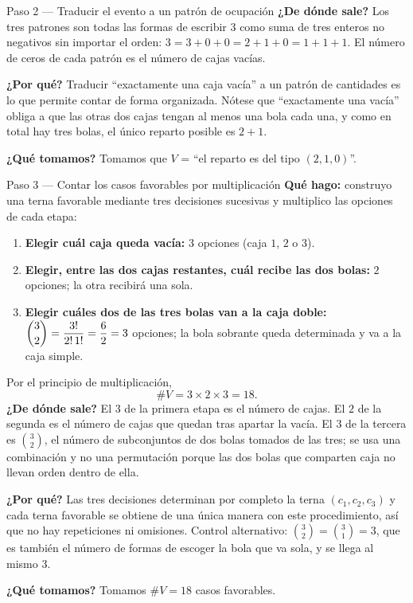 \documentclass[11pt]{article}
\begin{document}
\begin{sol}
\begin{paso}{Paso 2 --- Traducir el evento a un patrón de ocupación}
\textbf{¿De dónde sale?} Los tres patrones son todas las formas de escribir $3$ como suma de
tres enteros no negativos sin importar el orden: $3=3+0+0=2+1+0=1+1+1$. El número de ceros de
cada patrón es el número de cajas vacías.

\textbf{¿Por qué?} Traducir ``exactamente una caja vacía'' a un patrón de cantidades es lo que
permite contar de forma organizada. Nótese que ``exactamente una vacía'' obliga a que las
otras dos cajas tengan al menos una bola cada una, y como en total hay tres bolas, el único
reparto posible es $2+1$.

\textbf{¿Qué tomamos?} Tomamos que $V$ = ``el reparto es del tipo $(2,1,0)$''.
\end{paso}

\begin{paso}{Paso 3 --- Contar los casos favorables por multiplicación}
\textbf{Qué hago:} construyo una terna favorable mediante tres decisiones sucesivas y
multiplico las opciones de cada etapa:
\begin{enumerate}[leftmargin=*]
  \item \textbf{Elegir cuál caja queda vacía:} $3$ opciones (caja $1$, $2$ o $3$).
  \item \textbf{Elegir, entre las dos cajas restantes, cuál recibe las dos bolas:} $2$
        opciones; la otra recibirá una sola.
  \item \textbf{Elegir cuáles dos de las tres bolas van a la caja doble:}
        $\dbinom{3}{2}=\dfrac{3!}{2!\,1!}=\dfrac{6}{2}=3$ opciones; la bola sobrante queda
        determinada y va a la caja simple.
\end{enumerate}
Por el principio de multiplicación,
\[
\#V=3\times 2\times 3=18 .
\]
\textbf{¿De dónde sale?} El $3$ de la primera etapa es el número de cajas. El $2$ de la
segunda es el número de cajas que quedan tras apartar la vacía. El $3$ de la tercera es
$\binom{3}{2}$, el número de subconjuntos de dos bolas tomados de las tres; se usa una
combinación y no una permutación porque las dos bolas que comparten caja no llevan orden
dentro de ella.

\textbf{¿Por qué?} Las tres decisiones determinan por completo la terna $(c_1,c_2,c_3)$ y cada
terna favorable se obtiene de una única manera con este procedimiento, así que no hay
repeticiones ni omisiones. Control alternativo: $\binom{3}{2}=\binom{3}{1}=3$, que es también
el número de formas de escoger la bola que va sola, y se llega al mismo $3$.

\textbf{¿Qué tomamos?} Tomamos $\#V=18$ casos favorables.
\end{paso}


\end{sol}
\end{document}
